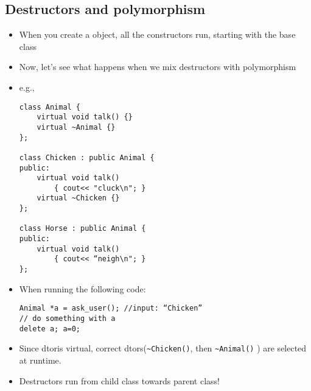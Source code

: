 \subsection{Destructors and polymorphism}
\begin{itemize}
	\item When you create a object, all the constructors run, starting with the base class
	\item Now, let's see what happens when we mix destructors with polymorphism
	\item e.g.,
\begin{lstlisting}[style=C++]
class Animal {
	virtual void talk() {}
	virtual ~Animal {}
};

class Chicken : public Animal {
public:
	virtual void talk()
		{ cout<< "cluck\n"; }
	virtual ~Chicken {}
};

class Horse : public Animal {
public:
	virtual void talk()
		{ cout<< “neigh\n"; }
};
\end{lstlisting}
	\item When running the following code:
\begin{lstlisting}[style=C++]
Animal *a = ask_user(); //input: “Chicken”
// do something with a
delete a; a=0;
\end{lstlisting}
	\item Since dtoris virtual, correct dtors(\lstinline[style=C++]{~Chicken()}, then \lstinline[style=C++]{~Animal()} ) are selected at runtime.
	\item Destructors run from child class towards parent class!
\end{itemize}